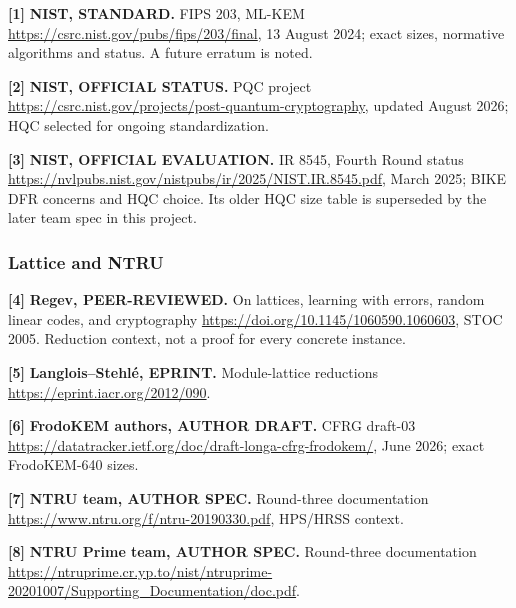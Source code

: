 \documentclass[
  10pt,
  a4paper,
]{article}
\begin{document}
\hypertarget{ref1}{}

\textbf{{[}1{]}} \textbf{NIST, STANDARD.} FIPS 203, ML-KEM
\url{https://csrc.nist.gov/pubs/fips/203/final}, 13 August 2024; exact
sizes, normative algorithms and status. A future erratum is noted.

\hypertarget{ref2}{}

\textbf{{[}2{]}} \textbf{NIST, OFFICIAL STATUS.} PQC project
\url{https://csrc.nist.gov/projects/post-quantum-cryptography}, updated
August 2026; HQC selected for ongoing standardization.

\hypertarget{ref3}{}

\textbf{{[}3{]}} \textbf{NIST, OFFICIAL EVALUATION.} IR 8545, Fourth
Round status
\url{https://nvlpubs.nist.gov/nistpubs/ir/2025/NIST.IR.8545.pdf}, March
2025; BIKE DFR concerns and HQC choice. Its older HQC size table is
superseded by the later team spec in this project.

\hypertarget{lattice-and-ntru}{%
\subsubsection{Lattice and NTRU}\label{lattice-and-ntru}}

\hypertarget{ref4}{}

\textbf{{[}4{]}} \textbf{Regev, PEER-REVIEWED.} On lattices, learning
with errors, random linear codes, and cryptography
\url{https://doi.org/10.1145/1060590.1060603}, STOC 2005. Reduction
context, not a proof for every concrete instance.

\hypertarget{ref5}{}

\textbf{{[}5{]}} \textbf{Langlois--Stehlé, EPRINT.} Module-lattice
reductions \url{https://eprint.iacr.org/2012/090}.

\hypertarget{ref6}{}

\textbf{{[}6{]}} \textbf{FrodoKEM authors, AUTHOR DRAFT.} CFRG draft-03
\url{https://datatracker.ietf.org/doc/draft-longa-cfrg-frodokem/}, June
2026; exact FrodoKEM-640 sizes.

\hypertarget{ref7}{}

\textbf{{[}7{]}} \textbf{NTRU team, AUTHOR SPEC.} Round-three
documentation \url{https://www.ntru.org/f/ntru-20190330.pdf}, HPS/HRSS
context.

\hypertarget{ref8}{}

\textbf{{[}8{]}} \textbf{NTRU Prime team, AUTHOR SPEC.} Round-three
documentation
\url{https://ntruprime.cr.yp.to/nist/ntruprime-20201007/Supporting_Documentation/doc.pdf}.
\end{document}
